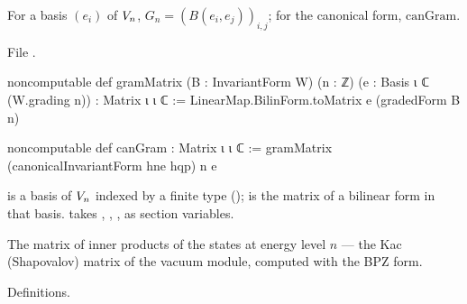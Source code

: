 \begin{definition}\label{l04:def:gram}
For a basis $(e_i)$ of $V_n$, $G_n = (B(e_i,e_j))_{i,j}$; for the canonical form, $\mathrm{canGram}$.
\end{definition}
\noindent File .
\begin{leancode}
noncomputable def gramMatrix (B : InvariantForm W) (n : ℤ) (e : Basis ι ℂ (W.grading n)) :
    Matrix ι ι ℂ :=
  LinearMap.BilinForm.toMatrix e (gradedForm B n)

noncomputable def canGram : Matrix ι ι ℂ := gramMatrix (canonicalInvariantForm hne hqp) n e
\end{leancode}
\begin{dictionary}
 is a basis of $V_n$ indexed by a finite type 
(\lean{[Fintype ι]});  is the matrix of a bilinear form in that basis.  takes
, , ,  as section variables.
\end{dictionary}
\begin{physics}
The matrix of inner products of the states at energy level $n$ --- the Kac (Shapovalov) matrix of the
vacuum module, computed with the BPZ form.
\end{physics}
\begin{status}
Definitions.
\end{status}

